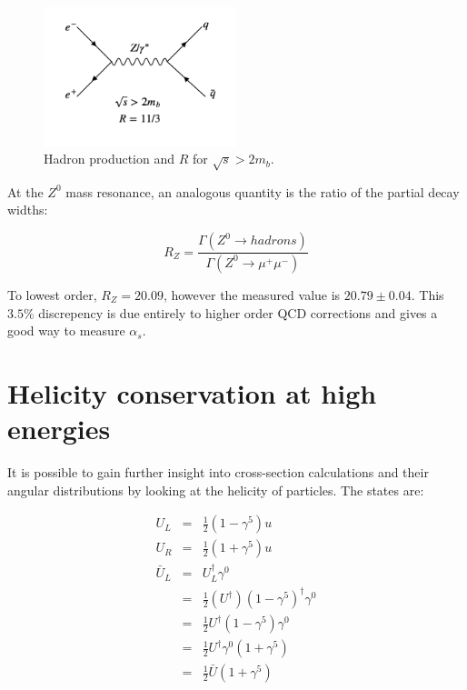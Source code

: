 \begin{figure}[!htb]
  \begin{center}
    \includegraphics[width=0.5\textwidth]{images/web_feynman/image_34.png}
    \caption[Hadron production and $R$ for $\sqrt{s}>2m_b$]{Hadron production and $R$ for $\sqrt{s}>2m_b$.}
    \label{fig:ch8_EpEmR}
  \end{center}
\end{figure}

At the $Z^0$ mass resonance, an analogous quantity is the ratio of the partial decay widths:

\[
  R_Z = \frac{\Gamma(Z^0 \to hadrons)}{\Gamma(Z^0 \to \mu^+ \mu^-)}
\]

To lowest order, $R_Z = 20.09$, however the measured value is $20.79 \pm 0.04$.  This $3.5\%$ discrepency is due entirely to higher order QCD corrections and gives a good way to measure $\alpha_s$.

\section{Helicity conservation at high energies}

It is possible to gain further insight into cross-section calculations and their angular distributions by looking at the helicity of particles.  The states are:

\begin{eqnarray*}
  U_L & = & \frac{1}{2}\left(1 - \gamma^5\right)u \\
  U_R & = & \frac{1}{2}\left(1 + \gamma^5\right)u \\
  \bar{U}_L & = & U_L^{\dagger}\gamma^0 \\
  & = & \frac{1}{2}\left(U^{\dagger}\right)\left(1 - \gamma^5\right)^{\dagger}\gamma^0 \\
  & = & \frac{1}{2}U^{\dagger}\left(1 - \gamma^5\right)\gamma^0 \\
  & = & \frac{1}{2}U^{\dagger}\gamma^0\left(1 + \gamma^5\right) \\
  & = & \frac{1}{2}\bar{U}\left(1 + \gamma^5\right)
\end{eqnarray*}

